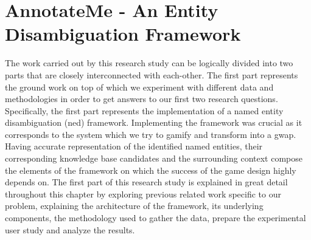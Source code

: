\chapter{AnnotateMe - An Entity Disambiguation Framework}
\label{chap:annotateme}
The work carried out by this research study can be logically divided into two parts that are closely interconnected with each-other. The first part represents the ground work on top of which we experiment with different data and methodologies in order to get answers to our first two research questions. Specifically, the first part represents the implementation of a named entity disambiguation (\ac{ned}) framework. Implementing the framework was crucial as it corresponds to the system which we try to gamify and transform into a \ac{gwap}. Having accurate representation of the identified named entities, their corresponding knowledge base candidates and the surrounding context compose the elements of the framework on which the success of the game design highly depends on. The first part of this research study is explained in great detail throughout this chapter by exploring previous related work specific to our problem, explaining the architecture of the framework, its underlying components, the methodology used to gather the data, prepare the experimental user study and analyze the results.




\newpage

\newpage


